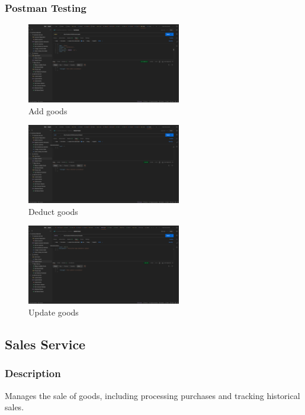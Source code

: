 \documentclass[a4paper,12pt]{article}
\begin{document}
\subsubsection{Postman Testing}
\begin{figure}[H]
  \centering
  \includegraphics[width=0.6\textwidth]{images/8.png}
  \caption{Add goods}
\end{figure}
\begin{figure}[H]
  \centering
  \includegraphics[width=0.6\textwidth]{images/9.png}
  \caption{Deduct goods}
\end{figure}
\begin{figure}[H]
  \centering
  \includegraphics[width=0.6\textwidth]{images/10.png}
  \caption{Update goods}
\end{figure}



\subsection{Sales Service}
\subsubsection{Description}
Manages the sale of goods, including processing purchases and tracking historical sales.
\end{document}
